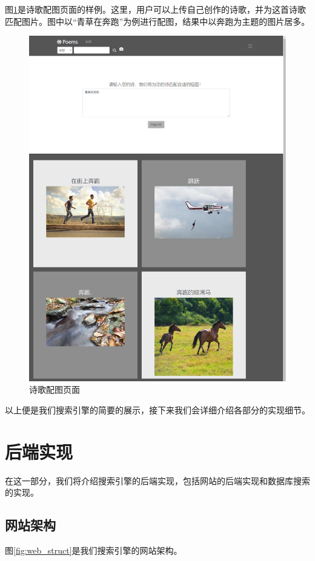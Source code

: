 \documentclass[a4paper, 10pt]{article}
\begin{document}
图\ref{fig:demo_matchimage}是诗歌配图页面的样例。这里，用户可以上传自己创作的诗歌，并为这首诗歌匹配图片。图中以“青草在奔跑”为例进行配图，结果中以奔跑为主题的图片居多。

\begin{figure}[H]
\centering
\includegraphics[scale=0.48]{fig/demo_matchimage.png}
\caption{诗歌配图页面}
\label{fig:demo_matchimage}
\end{figure}

以上便是我们搜索引擎的简要的展示，接下来我们会详细介绍各部分的实现细节。

\section{后端实现}
在这一部分，我们将介绍搜索引擎的后端实现，包括网站的后端实现和数据库搜索的实现。

\subsection{网站架构}
图\ref{fig:web_struct}是我们搜索引擎的网站架构。
\end{document}
